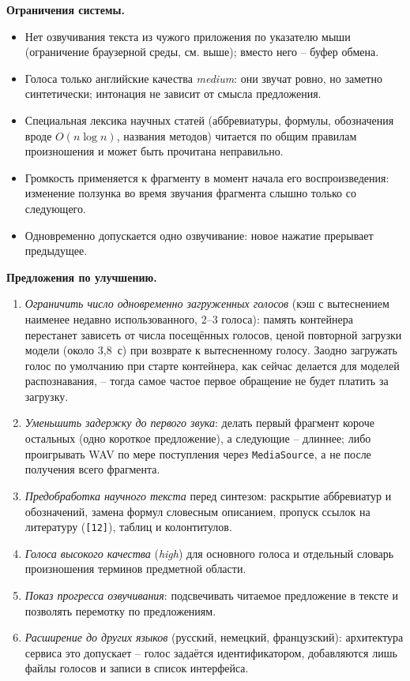 \textbf{Ограничения системы.}
\begin{itemize}
  \item Нет озвучивания текста из чужого приложения по указателю мыши
  (ограничение браузерной среды, см. выше); вместо него --
  буфер обмена.
  \item Голоса только английские качества \emph{medium}: они звучат
  ровно, но заметно синтетически; интонация не зависит от смысла
  предложения.
  \item Специальная лексика научных статей (аббревиатуры, формулы,
  обозначения вроде $O(n \log n)$, названия методов) читается по
  общим правилам произношения и может быть прочитана неправильно.
  \item Громкость применяется к фрагменту в момент начала его
  воспроизведения: изменение ползунка во время звучания фрагмента
  слышно только со следующего.
  \item Одновременно допускается одно озвучивание: новое нажатие
  прерывает предыдущее.
\end{itemize}

\textbf{Предложения по улучшению.}
\begin{enumerate}
  \item \emph{Ограничить число одновременно загруженных голосов} (кэш
  с вытеснением наименее недавно использованного, 2--3 голоса): память
  контейнера перестанет зависеть от числа посещённых голосов, ценой
  повторной загрузки модели (около 3{,}8~с) при возврате к
  вытесненному голосу. Заодно загружать голос по умолчанию при
  старте контейнера, как сейчас делается для моделей распознавания, --
  тогда самое частое первое обращение не будет платить за загрузку.
  \item \emph{Уменьшить задержку до первого звука}: делать первый
  фрагмент короче остальных (одно короткое предложение), а следующие --
  длиннее; либо проигрывать WAV по мере поступления через
  \texttt{MediaSource}, а не после получения всего фрагмента.
  \item \emph{Предобработка научного текста} перед синтезом: раскрытие
  аббревиатур и обозначений, замена формул словесным описанием,
  пропуск ссылок на литературу (\texttt{[12]}), таблиц и колонтитулов.
  \item \emph{Голоса высокого качества} (\emph{high}) для основного
  голоса и отдельный словарь произношения терминов предметной области.
  \item \emph{Показ прогресса озвучивания}: подсвечивать читаемое
  предложение в тексте и позволять перемотку по предложениям.
  \item \emph{Расширение до других языков} (русский, немецкий,
  французский): архитектура сервиса это допускает -- голос задаётся
  идентификатором, добавляются лишь файлы голосов и записи в список
  интерфейса.
\end{enumerate}

